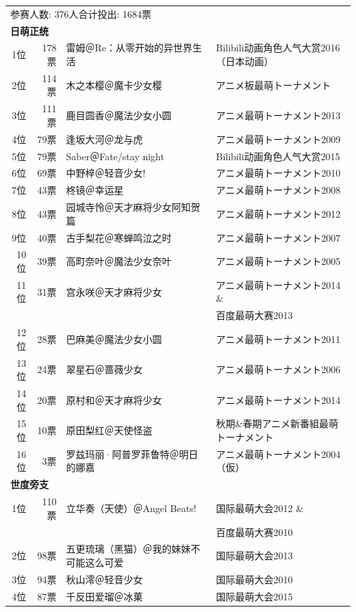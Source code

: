 {\kai\begin{longtable}{rrll}
\multicolumn{3}{l}{参赛人数: 376人\quad 合计投出: 1684票} \\
\multicolumn{3}{l}{\bfseries 日萌正统 } \\
1位 & 178票 & 雷姆＠$\!$Re：从零开始的异世界生活 & Bilibili动画角色人气大赏2016（日本动画） \\
2位 & 114票 & 木之本樱＠魔卡少女樱 & アニメ板最萌トーナメント \\
3位 & 111票 & 鹿目圆香＠魔法少女小圆 & アニメ最萌トーナメント2013\\
4位 & 79票 & 逢坂大河＠龙与虎 & アニメ最萌トーナメント2009\\
5位 & 79票 & Saber$\!$＠$\!$Fate/stay night & Bilibili动画角色人气大赏2015 \\
6位 & 69票 & 中野梓＠轻音少女! & アニメ最萌トーナメント2010\\
7位 & 43票 & 柊镜＠幸运星 & アニメ最萌トーナメント2008\\
8位 & 43票 & 园城寺怜＠天才麻将少女阿知贺篇 & アニメ最萌トーナメント2012\\
9位 & 40票 & 古手梨花＠寒蝉鸣泣之时 & アニメ最萌トーナメント2007\\
10位 & 39票 & 高町奈叶＠魔法少女奈叶 & アニメ最萌トーナメント2005 \\
11位 & 31票 & 宫永咲＠天才麻将少女 & アニメ最萌トーナメント2014 \&\\
 &  &  & 百度最萌大赛2013\\
12位 & 28票 & 巴麻美＠魔法少女小圆 & アニメ最萌トーナメント2011\\
13位 & 24票 & 翠星石＠蔷薇少女 & アニメ最萌トーナメント2006 \\
14位 & 20票 & 原村和＠天才麻将少女 & アニメ最萌トーナメント2014\\
15位 & 10票 & 原田梨红＠天使怪盗 & 秋期$\!$\&$\!$春期アニメ新番組最萌トーナメント \\
16位 & 3票 & 罗兹玛丽·阿普罗菲鲁特＠明日的娜嘉 & アニメ最萌トーナメント2004（仮） \\
\multicolumn{3}{l}{\bfseries 世度旁支 } \\
1位 & 110票 & 立华奏（天使）＠$\!$Angel Beats! & 国际最萌大会2012 \&\\
 &  & & 百度最萌大赛2010\\
2位 & 98票 & 五更琉璃（黑猫）＠我的妹妹不可能这么可爱 & 国际最萌大会2013 \\
3位 & 94票 & 秋山澪＠轻音少女 & 国际最萌大会2010 \\
4位 & 87票 & 千反田爱瑠＠冰菓 & 国际最萌大会2015 \\

\end{longtable}}
